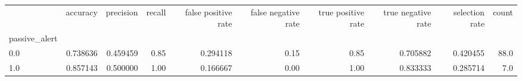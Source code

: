 \begin{tabular}{lrrrrrrrrr}
\toprule
{} &  accuracy &  precision &  recall &  false positive rate &  false negative rate &  true positive rate &  true negative rate &  selection rate &  count \\
passive\_alert &           &            &         &                      &                      &                     &                     &                 &        \\
\midrule
0.0           &  0.738636 &   0.459459 &    0.85 &             0.294118 &                 0.15 &                0.85 &            0.705882 &        0.420455 &   88.0 \\
1.0           &  0.857143 &   0.500000 &    1.00 &             0.166667 &                 0.00 &                1.00 &            0.833333 &        0.285714 &    7.0 \\
\bottomrule
\end{tabular}
